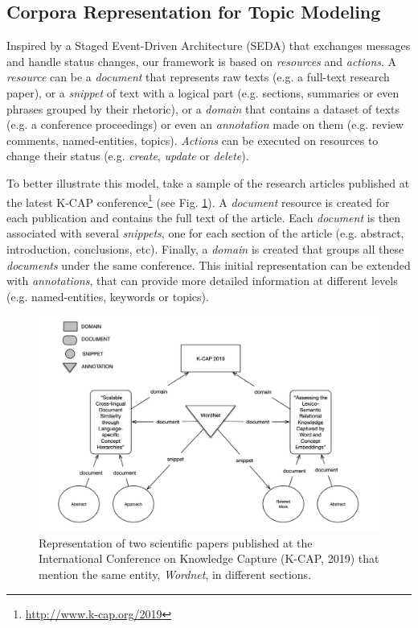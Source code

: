 \subsection{Corpora Representation for Topic Modeling}
\label{sec:representing-corpora}

Inspired by a Staged Event-Driven Architecture (SEDA) that exchanges messages and handle status changes, our framework is based on \textit{resources} and \textit{actions}. A \textit{resource} can be a \textit{document} that represents raw texts (e.g. a full-text research paper), or a \textit{snippet} of text with a logical part  (e.g. sections, summaries or even phrases grouped by their rhetoric), or a \textit{domain} that contains a dataset of texts (e.g. a conference proceedings) or even an \textit{annotation} made on them (e.g. review comments, named-entities, topics). \textit{Actions} can be executed on resources to change their status (e.g. \textit{create}, \textit{update} or \textit{delete}).

To better illustrate this model, take a sample of the research articles published at the latest K-CAP conference\footnote{\url{http://www.k-cap.org/2019}} (see Fig. \ref{fig:librairy-model}). A \textit{document} resource is created for each publication and contains the full text of the article. Each \textit{document} is then associated with several \textit{snippets}, one for each section of the article (e.g. abstract, introduction, conclusions, etc). Finally, a \textit{domain} is created that groups all these \textit{documents} under the same conference. This initial representation can be extended with \textit{annotations}, that can provide more detailed information at different levels (e.g. named-entities, keywords or topics).

% 
\begin{figure}
  \center
  \includegraphics[scale=0.55]{model}
  \caption{Representation of two scientific papers published at the International Conference on Knowledge Capture (K-CAP, 2019) that mention the same entity, \textit{Wordnet}, in different sections.}
  \label{fig:librairy-model}
\end{figure}

